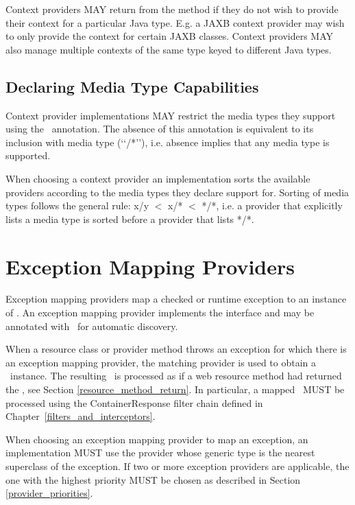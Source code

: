 Context providers MAY return  from the  method if they do not wish to provide their context for a particular Java type. E.g. a JAXB context provider may wish to only provide the context for certain JAXB classes. Context providers MAY also manage multiple contexts of the same type keyed to different Java types.

\subsection{Declaring Media Type Capabilities}
\label{context_media_type}

Context provider implementations MAY restrict the media types they support using the \Produces\ annotation. The absence of this annotation is equivalent to its inclusion with media type (\lq\lq*/*\rq\rq), i.e. absence implies that any media type is supported.

When choosing a context provider an implementation sorts the available providers according to the media types they declare support for. Sorting of media types follows the general rule: x/y $<$ x/* $<$ */*, i.e. a provider that explicitly lists a media type is sorted before a provider that lists */*.

\section{Exception Mapping Providers}
\label{exceptionmapper}

Exception mapping providers map a checked or runtime exception to an instance of \Response. An exception mapping provider implements the  interface and may be annotated with \Provider\ for automatic discovery. 

When a resource class or provider method throws an exception for which there is an exception mapping provider, the matching provider is used to obtain a \Response\ instance. The resulting \Response\ is processed as if a web resource method had returned the \Response, see Section \ref{resource_method_return}. In particular, a mapped \Response\ MUST be processed using the ContainerResponse filter chain defined in  Chapter~\ref{filters_and_interceptors}.

When choosing an exception mapping provider to map an exception, an implementation MUST use the provider whose generic type is the nearest superclass of the exception. If two or more exception providers are applicable, the one with the highest priority MUST be chosen as described in Section \ref{provider_priorities}.

